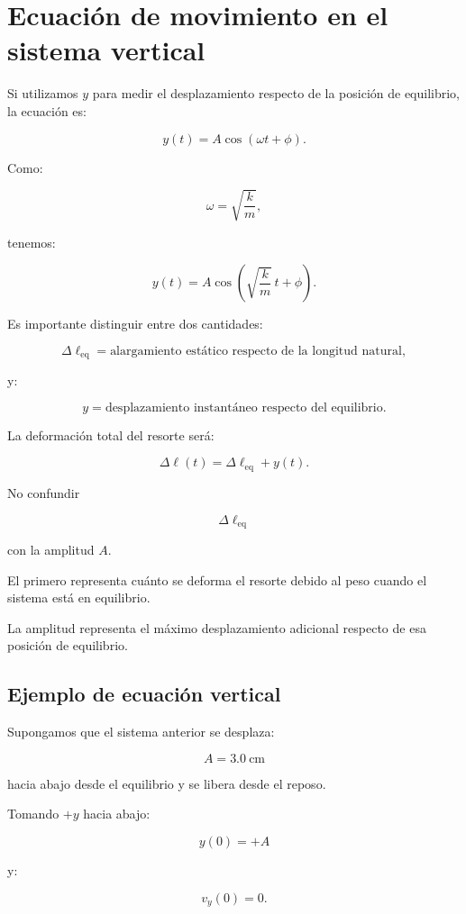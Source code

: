 \section{Ecuación de movimiento en el sistema vertical}

Si utilizamos \(y\) para medir el desplazamiento respecto de la posición de equilibrio, la ecuación es:

\[ y(t)=A\cos(\omega t+\phi). \]

Como:

\[ \omega=\sqrt{\frac{k}{m}}, \]

tenemos:

\[ \boxed{y(t)=A\cos\left(\sqrt{\frac{k}{m}}\,t+\phi\right)}. \]

Es importante distinguir entre dos cantidades:

\[
\Delta\ell_{\mathrm{eq}}
=
\text{alargamiento estático respecto de la longitud natural},
\]

y:

\[
y
=
\text{desplazamiento instantáneo respecto del equilibrio}.
\]

La deformación total del resorte será:

\[ \boxed{\Delta\ell(t)=\Delta\ell_{\mathrm{eq}}+y(t)}. \]

\begin{errorfrecuente}
No confundir

\[ \Delta\ell_{\mathrm{eq}} \]

con la amplitud \(A\).

El primero representa cuánto se deforma el resorte debido al peso cuando el sistema está en equilibrio.

La amplitud representa el máximo desplazamiento adicional respecto de esa posición de equilibrio.
\end{errorfrecuente}


\subsection{Ejemplo de ecuación vertical}

Supongamos que el sistema anterior se desplaza:

\[ A=\SI{3.0}{\centi\meter} \]

hacia abajo desde el equilibrio y se libera desde el reposo.

Tomando \(+y\) hacia abajo:

\[ y(0)=+A \]

y:

\[ v_y(0)=0. \]

